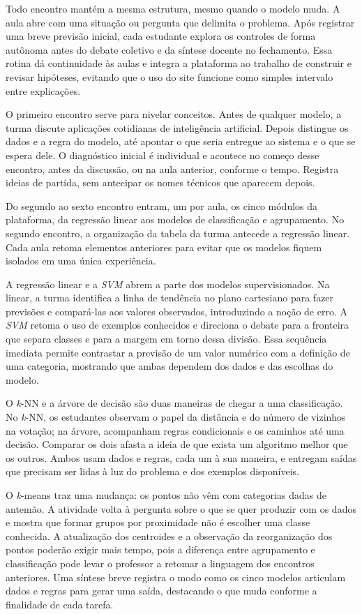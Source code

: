 Todo encontro mantém a mesma estrutura, mesmo quando o modelo muda. A aula abre com uma situação ou pergunta que delimita o problema. Após registrar uma breve previsão inicial, cada estudante explora os controles de forma autônoma antes do debate coletivo e da síntese docente no fechamento. Essa rotina dá continuidade às aulas e integra a plataforma ao trabalho de construir e revisar hipóteses, evitando que o uso do site funcione como simples intervalo entre explicações.

O primeiro encontro serve para nivelar conceitos. Antes de qualquer modelo, a turma discute aplicações cotidianas de inteligência artificial. Depois distingue os dados e a regra do modelo, até apontar o que seria entregue ao sistema e o que se espera dele. O diagnóstico inicial é individual e acontece no começo desse encontro, antes da discussão, ou na aula anterior, conforme o tempo. Registra ideias de partida, sem antecipar os nomes técnicos que aparecem depois.

Do segundo ao sexto encontro entram, um por aula, os cinco módulos da plataforma, da regressão linear aos modelos de classificação e agrupamento. No segundo encontro, a organização da tabela da turma antecede a regressão linear. Cada aula retoma elementos anteriores para evitar que os modelos fiquem isolados em uma única experiência.

A regressão linear e a \textit{SVM} abrem a parte dos modelos supervisionados. Na linear, a turma identifica a linha de tendência no plano cartesiano para fazer previsões e compará-las aos valores observados, introduzindo a noção de erro. A \textit{SVM} retoma o uso de exemplos conhecidos e direciona o debate para a fronteira que separa classes e para a margem em torno dessa divisão. Essa sequência imediata permite contrastar a previsão de um valor numérico com a definição de uma categoria, mostrando que ambas dependem dos dados e das escolhas do modelo.

O \textit{k}-NN e a árvore de decisão são duas maneiras de chegar a uma classificação. No \textit{k}-NN, os estudantes observam o papel da distância e do número de vizinhos na votação; na árvore, acompanham regras condicionais e os caminhos até uma decisão. Comparar os dois afasta a ideia de que exista um algoritmo melhor que os outros. Ambos usam dados e regras, cada um à sua maneira, e entregam saídas que precisam ser lidas à luz do problema e dos exemplos disponíveis.

O \textit{k}-means traz uma mudança: os pontos não vêm com categorias dadas de antemão. A atividade volta à pergunta sobre o que se quer produzir com os dados e mostra que formar grupos por proximidade não é escolher uma classe conhecida. A atualização dos centroides e a observação da reorganização dos pontos poderão exigir mais tempo, pois a diferença entre agrupamento e classificação pode levar o professor a retomar a linguagem dos encontros anteriores. Uma síntese breve registra o modo como os cinco modelos articulam dados e regras para gerar uma saída, destacando o que muda conforme a finalidade de cada tarefa.

